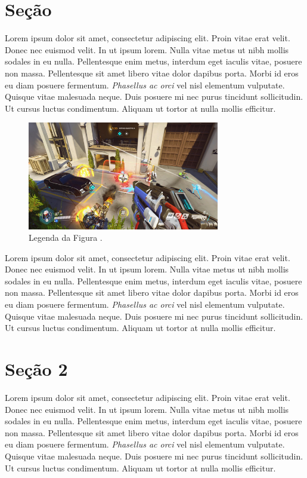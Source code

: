 \documentclass[10pt, conference, compsocconf]{IEEEtran}
\begin{document}
\section{Seção}
Lorem ipsum dolor sit amet, consectetur adipiscing elit. Proin vitae erat velit. Donec nec euismod velit. In ut ipsum lorem. Nulla vitae metus ut nibh mollis sodales in eu nulla. Pellentesque enim metus, interdum eget iaculis vitae, posuere non massa. Pellentesque sit amet libero vitae dolor dapibus porta. Morbi id eros eu diam posuere fermentum. \textit{Phasellus ac orci} vel nisl elementum vulputate. Quisque vitae malesuada neque. Duis posuere mi nec purus tincidunt sollicitudin. Ut cursus luctus condimentum. Aliquam ut tortor at nulla mollis efficitur.

\FloatBarrier

\begin{figure}[!h]
\centering
\includegraphics[width=3.3in]{images/Overwatch.png}
\caption{Legenda da Figura \cite{FreyaHolmer}.} 
\label{figuraOverwatch}
\end{figure}

\FloatBarrier

Lorem ipsum dolor sit amet, consectetur adipiscing elit. Proin vitae erat velit. Donec nec euismod velit. In ut ipsum lorem. Nulla vitae metus ut nibh mollis sodales in eu nulla. Pellentesque enim metus, interdum eget iaculis vitae, posuere non massa. Pellentesque sit amet libero vitae dolor dapibus porta. Morbi id eros eu diam posuere fermentum. \textit{Phasellus ac orci} vel nisl elementum vulputate. Quisque vitae malesuada neque. Duis posuere mi nec purus tincidunt sollicitudin. Ut cursus luctus condimentum. Aliquam ut tortor at nulla mollis efficitur.

\section{Seção 2}

Lorem ipsum dolor sit amet, consectetur adipiscing elit. Proin vitae erat velit. Donec nec euismod velit. In ut ipsum lorem. Nulla vitae metus ut nibh mollis sodales in eu nulla. Pellentesque enim metus, interdum eget iaculis vitae, posuere non massa. Pellentesque sit amet libero vitae dolor dapibus porta. Morbi id eros eu diam posuere fermentum. \textit{Phasellus ac orci} vel nisl elementum vulputate. Quisque vitae malesuada neque. Duis posuere mi nec purus tincidunt sollicitudin. Ut cursus luctus condimentum. Aliquam ut tortor at nulla mollis efficitur.
\end{document}
